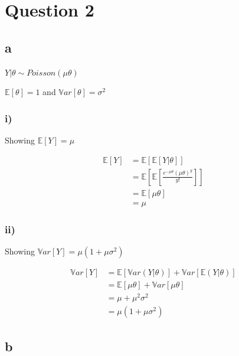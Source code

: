 \documentclass[]{article}
\begin{document}
\hypertarget{question-2}{%
\section{Question 2}\label{question-2}}

\hypertarget{a-1}{%
\subsection{a}\label{a-1}}

\(Y | \theta \sim Poisson(\mu \theta)\)

\(\mathbb{E}[\theta] = 1\) and \(\mathbb{V}ar[\theta] = \sigma^2\)

\hypertarget{i-3}{%
\subsubsection{i)}\label{i-3}}

Showing \(\mathbb{E}[Y] = \mu\)

\[
\begin{aligned}
\mathbb{E}[Y] &= \mathbb{E}\left[\mathbb{E}[Y|\theta]\right] \\
&= \mathbb{E}\left[\mathbb{E}\left[\frac{{e^{ - \mu\theta } (\mu\theta) ^y }}{{y!}}\right]\right] \\
&= \mathbb{E}\left[ \mu \theta \right] \\
&= \mu
\end{aligned}
\]

\hypertarget{ii-3}{%
\subsubsection{ii)}\label{ii-3}}

Showing \(\mathbb{V}ar[Y] = \mu(1+\mu\sigma^2)\)

\[
\begin{aligned}
\mathbb{V}ar[Y] &= \mathbb{E}\left[\mathbb{V}ar(Y|\theta) \right] + \mathbb{V}ar\left[\mathbb{E}(Y|\theta) \right]\\
&= \mathbb{E}\left[ \mu \theta \right] +  \mathbb{V}ar\left[ \mu \theta \right] \\
&= \mu + \mu^2\sigma^2 \\
&= \mu(1+\mu\sigma^2)
\end{aligned}
\]

\hypertarget{b-1}{%
\subsection{b}\label{b-1}}
\end{document}
